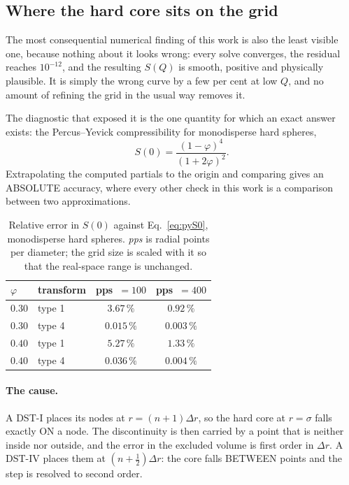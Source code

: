 \documentclass[11pt,a4paper]{article}
\begin{document}
\subsection{Where the hard core sits on the grid}
\label{sec:coreongrid}

The most consequential numerical finding of this work is also the least
visible one, because nothing about it looks wrong: every solve converges, the
residual reaches $10^{-12}$, and the resulting $S(Q)$ is smooth, positive and
physically plausible. It is simply the wrong curve by a few per cent at low
$Q$, and no amount of refining the grid in the usual way removes it.

The diagnostic that exposed it is the one quantity for which an exact answer
exists: the Percus--Yevick compressibility for monodisperse hard spheres,
\begin{equation}
  S(0) = \frac{(1-\varphi)^{4}}{(1+2\varphi)^{2}}.
  \label{eq:pyS0}
\end{equation}
Extrapolating the computed partials to the origin and comparing gives an
ABSOLUTE accuracy, where every other check in this work is a comparison
between two approximations.

\begin{table}[htbp]
\centering
\caption{Relative error in $S(0)$ against Eq.~\eqref{eq:pyS0}, monodisperse
hard spheres. \emph{pps} is radial points per diameter; the grid size is
scaled with it so that the real-space range is unchanged.}
\begin{tabular}{llcc}
\toprule
$\varphi$ & transform & pps~$=100$ & pps~$=400$\\
\midrule
$0.30$ & type 1 & $3.67\,\%$ & $0.92\,\%$\\
$0.30$ & type 4 & $0.015\,\%$ & $0.003\,\%$\\
$0.40$ & type 1 & $5.27\,\%$ & $1.33\,\%$\\
$0.40$ & type 4 & $0.036\,\%$ & $0.004\,\%$\\
\bottomrule
\end{tabular}
\label{tab:S0accuracy}
\end{table}

\paragraph{The cause.} A DST-I places its nodes at $r = (n+1)\Delta r$, so
the hard core at $r = \sigma$ falls exactly ON a node. The discontinuity is
then carried by a point that is neither inside nor outside, and the error in
the excluded volume is first order in $\Delta r$. A DST-IV places them at
$(n+\tfrac{1}{2})\Delta r$: the core falls BETWEEN points and the step is
resolved to second order.
\end{document}
